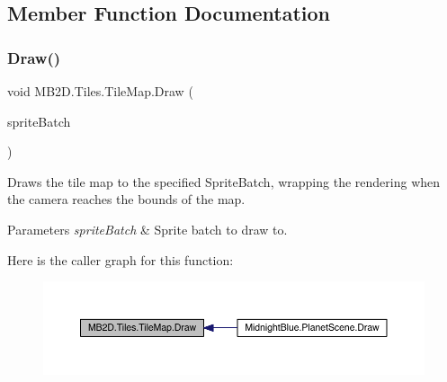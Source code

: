 \subsection{Member Function Documentation}
\hypertarget{class_m_b2_d_1_1_tiles_1_1_tile_map_aa4c7f815bf7b9fc53a4dcf1a2b0df175}{}\label{class_m_b2_d_1_1_tiles_1_1_tile_map_aa4c7f815bf7b9fc53a4dcf1a2b0df175} 
\subsubsection{\texorpdfstring{Draw()}{Draw()}}
{\footnotesize\ttfamily void M\+B2\+D.\+Tiles.\+Tile\+Map.\+Draw (\begin{DoxyParamCaption}\item[{Sprite\+Batch}]{sprite\+Batch }\end{DoxyParamCaption})\hspace{0.3cm}{\ttfamily [inline]}}



Draws the tile map to the specified Sprite\+Batch, wrapping the rendering when the camera reaches the bounds of the map. 


\begin{DoxyParams}{Parameters}
{\em sprite\+Batch} & Sprite batch to draw to.\\
\hline
\end{DoxyParams}
Here is the caller graph for this function\+:\nopagebreak
\begin{figure}[H]
\begin{center}
\leavevmode
\includegraphics[width=350pt]{class_m_b2_d_1_1_tiles_1_1_tile_map_aa4c7f815bf7b9fc53a4dcf1a2b0df175_icgraph}
\end{center}
\end{figure}
\hypertarget{class_m_b2_d_1_1_tiles_1_1_tile_map_acc786702f8dfb76227fcd76ce0b20510}{}\label{class_m_b2_d_1_1_tiles_1_1_tile_map_acc786702f8dfb76227fcd76ce0b20510} 
